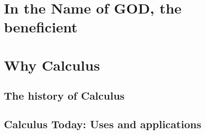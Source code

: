 \usepackage{lipsum}

\usepackage{algorithm}
\usepackage{algpseudocode}
\usepackage{amsmath}
\usepackage{pstricks-add}
\usepackage{xfp}

\usepackage{graphicx}
\usepackage{tikz}
\usepackage{pgfplots}
\usetikzlibrary{patterns}




\coverpage{\TITLE}{\SUBTITLE}{\AUTHOR}{\DATE}{\SUBJECT}
\newpage
\tableofcontents
%
%

\part{In the Name of GOD, the beneficient}



\part{Why Calculus}
\newpage
\chapter{The history of Calculus} \label{ch:lorem}

\newpage
\chapter{Calculus Today: Uses and applications }\label{ch:ipsum}



